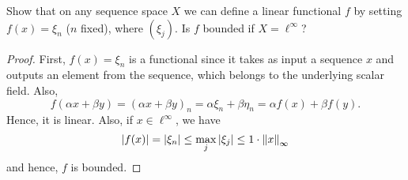 \begin{question}
    Show that on any sequence space $X$ we can define a linear functional $f$ by setting $f(x) = \xi_n$ ($n$ fixed), where $(\xi_j)$. Is $f$ bounded if $X = \ell^\infty$?
    \label{section2.8-5}
\end{question}
\begin{proof}
    First, $f(x) = \xi_n$ is a functional since it takes as input a sequence $x$ and outputs an element from the sequence, which belongs to the underlying scalar field. Also,
    \[f(\alpha x + \beta y) = (\alpha x + \beta y)_n = \alpha \xi_n + \beta \eta_n = \alpha f(x) + \beta f(y).\]
    Hence, it is linear. Also, if $x \in \ell^\infty$, we have
    \[\left\lvert f(x) \right\rvert = \left\lvert \xi_n \right\rvert \leq \max_{j} \left\lvert \xi_j \right\rvert \leq 1\cdot \left\lVert x \right\rVert_\infty\]
    and hence, $f$ is bounded.
\end{proof}

